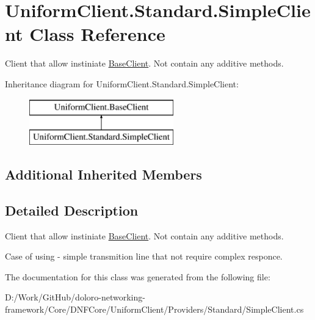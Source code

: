 \hypertarget{class_uniform_client_1_1_standard_1_1_simple_client}{}\section{Uniform\+Client.\+Standard.\+Simple\+Client Class Reference}
\label{class_uniform_client_1_1_standard_1_1_simple_client}


Client that allow instiniate \mbox{\hyperlink{class_uniform_client_1_1_base_client}{Base\+Client}}. Not contain any additive methods.  


Inheritance diagram for Uniform\+Client.\+Standard.\+Simple\+Client\+:\begin{figure}[H]
\begin{center}
\leavevmode
\includegraphics[height=2.000000cm]{d0/d21/class_uniform_client_1_1_standard_1_1_simple_client}
\end{center}
\end{figure}
\subsection*{Additional Inherited Members}


\subsection{Detailed Description}
Client that allow instiniate \mbox{\hyperlink{class_uniform_client_1_1_base_client}{Base\+Client}}. Not contain any additive methods. 

Case of using -\/ simple transmition line that not require complex responce. 

The documentation for this class was generated from the following file\+:\begin{DoxyCompactItemize}
\item 
D\+:/\+Work/\+Git\+Hub/doloro-\/networking-\/framework/\+Core/\+D\+N\+F\+Core/\+Uniform\+Client/\+Providers/\+Standard/Simple\+Client.\+cs\end{DoxyCompactItemize}

